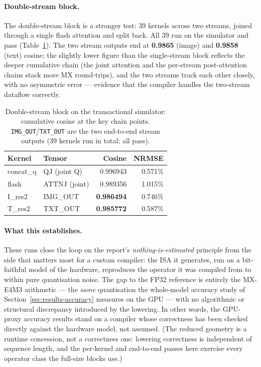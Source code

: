 \documentclass[11pt]{report}
\begin{document}
\paragraph{Double-stream block.} The double-stream block is a stronger test:
39 kernels across two streams, joined through a single flash attention and
split back. All 39 run on the simulator and pass (Table~\ref{tab:sim-dsb}).
The two stream outputs end at \textbf{0.9865} (image) and \textbf{0.9858}
(text) cosine; the slightly lower figure than the single-stream block reflects
the deeper cumulative chain (the joint attention and the per-stream
post-attention chains stack more MX round-trips), and the two streams track
each other closely, with no asymmetric error --- evidence that the compiler
handles the two-stream dataflow correctly.

\begin{table}[h]
\centering
\caption{Double-stream block on the transactional simulator: cumulative cosine
at the key chain points. \texttt{IMG\_OUT}/\texttt{TXT\_OUT} are the two
end-to-end stream outputs (39 kernels run in total; all pass).}
\label{tab:sim-dsb}
\begin{tabular}{@{}llrr@{}}
\toprule
Kernel & Tensor & Cosine & NRMSE \\
\midrule
concat\_q & QJ (joint Q)   & 0.996943 & 0.571\% \\
flash     & ATTNJ (joint)  & 0.989356 & 1.015\% \\
I\_res2   & IMG\_OUT       & \textbf{0.986494} & 0.746\% \\
T\_res2   & TXT\_OUT       & \textbf{0.985772} & 0.587\% \\
\bottomrule
\end{tabular}
\end{table}

\paragraph{What this establishes.} These runs close the loop on the report's
\emph{nothing-is-estimated} principle from the side that matters most for a
custom compiler: the ISA it generates, run on a bit-faithful model of the
hardware, reproduces the operator it was compiled from to within pure
quantisation noise. The gap to the FP32 reference is entirely the MX-E4M3
arithmetic --- the \emph{same} quantisation the whole-model accuracy study of
Section~\ref{sec:results-accuracy} measures on the GPU --- with no algorithmic
or structural discrepancy introduced by the lowering. In other words, the
GPU-proxy accuracy results stand on a compiler whose correctness has been
checked directly against the hardware model, not assumed. (The reduced
geometry is a runtime concession, not a correctness one: lowering correctness
is independent of sequence length, and the per-kernel and end-to-end passes
here exercise every operator class the full-size blocks use.)
\end{document}
